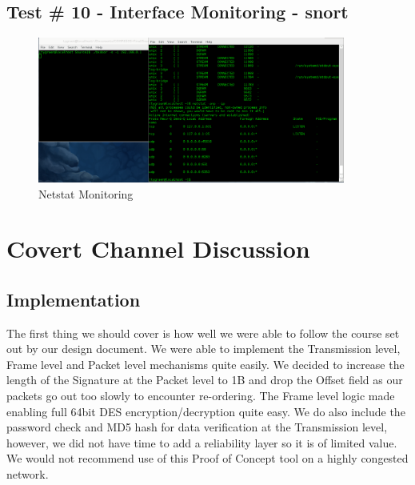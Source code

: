 \documentclass[titlepage]{article}
\begin{document}
\clearpage

\subsection{Test \# 10 - Interface Monitoring - snort}

\begin{figure}[htb]                                                                       
  \begin{center}
    \includegraphics[width=0.9\textwidth]{Pictures/netstat.png}
  \end{center}
  \caption{Netstat Monitoring}
  \label{fig:netstat}
\end{figure}

\clearpage

\section{Covert Channel Discussion}

\subsection{Implementation}

The first thing we should cover is how well we were able to follow the course set out by our design document.  We were able to implement the Transmission level, Frame level and Packet level mechanisms quite easily.  We decided to increase the length of the Signature at the Packet level to 1B and drop the Offset field as our packets go out too slowly to encounter re-ordering.  The Frame level logic made enabling full 64bit DES encryption/decryption quite easy.  We do also include the password check and MD5 hash for data verification at the Transmission level, however, we did not have time to add a reliability layer so it is of limited value. We would not recommend use of this Proof of Concept tool on a highly congested network.
\end{document}
